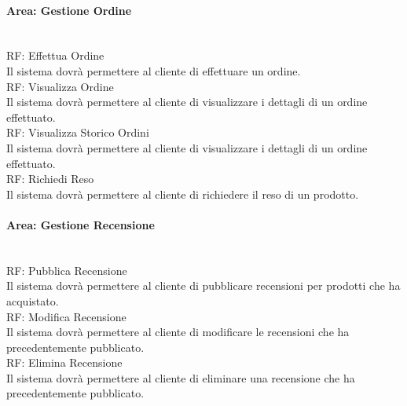 \paragraph{Area: Gestione Ordine}\mbox{}\\
RF\thecontrequisiti: Effettua Ordine\\
Il sistema dovrà permettere al cliente di effettuare un ordine.\vspace{10px} \\ 
RF\thecontrequisiti: Visualizza Ordine\\
Il sistema dovrà permettere al cliente di visualizzare i dettagli di un ordine effettuato.\vspace{10px} \\ 
RF\thecontrequisiti: Visualizza Storico Ordini\\
Il sistema dovrà permettere al cliente di visualizzare i dettagli di un ordine effettuato.\vspace{10px} \\ 
RF\thecontrequisiti: Richiedi Reso\\
Il sistema dovrà permettere al cliente di richiedere il reso di un prodotto.\vspace{10px} \\ 


\paragraph{Area: Gestione Recensione}\mbox{}\\
RF\thecontrequisiti: Pubblica Recensione\\
Il sistema dovrà permettere al cliente di pubblicare recensioni per prodotti che ha acquistato.\vspace{10px} \\ 
RF\thecontrequisiti: Modifica Recensione\\
Il sistema dovrà permettere al cliente di modificare le recensioni che ha precedentemente pubblicato.\vspace{10px} \\ 
RF\thecontrequisiti: Elimina Recensione\\
Il sistema dovrà permettere al cliente di eliminare una recensione che ha precedentemente pubblicato.\vspace{10px} \\ 


